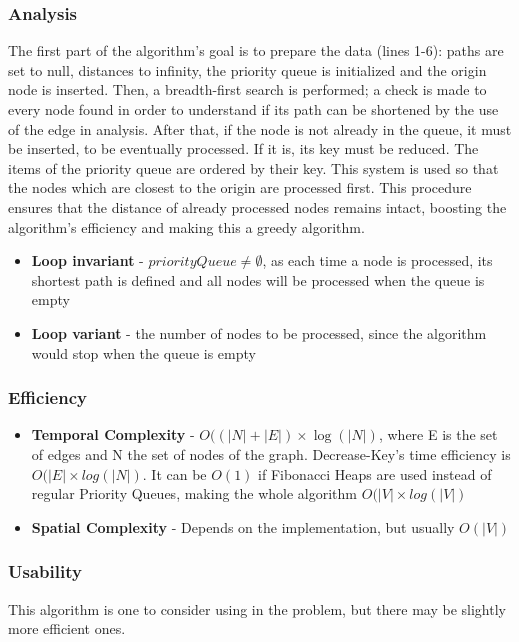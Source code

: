 

\subsubsection{Analysis}
The first part of the algorithm's goal is to prepare the data (lines 1-6): paths are set to null, distances to infinity, the priority queue is initialized and the origin node is inserted. Then, a breadth-first search is performed; a check is made to every node found in order to understand if its path can be shortened by the use of the edge in analysis. After that, if the node is not already in the queue, it must be inserted, to be eventually processed. If it is, its key must be reduced. The items of the priority queue are ordered by their key. This system is used so that the nodes which are closest to the origin are processed first. This procedure ensures that the distance of already processed nodes remains intact, boosting the algorithm's efficiency and making this a greedy algorithm. \\
\begin{itemize}
    \item \textbf{Loop invariant} - $ priorityQueue \neq \emptyset $, as each time a node is processed, its shortest path is defined and all nodes will be processed when the queue is empty
    \item \textbf{Loop variant} - the number of nodes to be processed, since the algorithm would stop when the queue is empty
\end{itemize}

\subsubsection{Efficiency}
\begin{itemize}
    \item \textbf{Temporal Complexity} - $ O((|N|+|E|) \times \log(|N|) $, where E is the set of edges and N the set of nodes of the graph. Decrease-Key's time efficiency is $ O(|E| \times log(|N|)$. It can be $ O(1) $ if Fibonacci Heaps are used instead of regular Priority Queues, making the whole algorithm $ O(|V| \times log(|V|) $ 
    \item \textbf{Spatial Complexity} - Depends on the implementation, but usually $ O(|V|) $
\end{itemize}

\subsubsection{Usability}
This algorithm is one to consider using in the problem, but there may be slightly more efficient ones.


